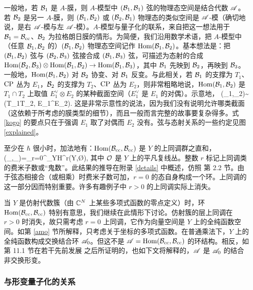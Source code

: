 一般地，若 ${\mathcal B}_1$ 是 $A$-膜，则 $A$-模型中 $({\mathcal B}_1,{\mathcal B}_1)$ 弦的物理态空间是结合代数 ${\mathscr A}$。若 ${\mathcal B}_2$ 是另一 $A$-膜，则 $({\mathcal B}_1,{\mathcal B}_2)$ 或 $({\mathcal B}_2,{\mathcal B}_1)$ 物理态的类似空间是 ${\mathscr A}$-模（确切地说，是右 ${\mathscr A}$-模与左 ${\mathscr A}$-模）。$A$-模型与量子化的联系，来自把这一想法用于 ${\mathcal B}_1={\mathcal B}_{\mathrm{cc}}$、${\mathcal B}_2$ 为拉格朗日膜的情形。为简便，我们沿用数学术语，把 $A$-模型中（任意 ${\mathcal B}_1,{\mathcal B}_2$ 的）$({\mathcal B}_1,{\mathcal B}_2)$ 物理态空间记作 ${\mathrm{Hom}}({\mathcal B}_1,{\mathcal B}_2)$。基本想法是：把 $({\mathcal B}_1,{\mathcal B}_2)$ 弦与 $({\mathcal B}_2,{\mathcal B}_3)$ 弦接合成 $({\mathcal B}_1,{\mathcal B}_3)$ 弦，可描述为态射的合成 ${\mathrm{Hom}}({\mathcal B}_2,{\mathcal B}_3)\otimes{\mathrm{Hom}}({\mathcal B}_1,{\mathcal B}_2)\to{\mathrm{Hom}}({\mathcal B}_1,{\mathcal B}_3)$，其中 ${\mathcal B}_1$ 先映到 ${\mathcal B}_2$，再映到 ${\mathcal B}_3$。一般地，${\mathrm{Hom}}({\mathcal B}_1,{\mathcal B}_2)$ 对 ${\mathcal B}_2$ 协变、对 ${\mathcal B}_1$ 反变。与此相关，若 ${\mathcal B}_1$ 的支撑为 $T_1$、${\mathrm{CP}}$ 丛为 $E_1$，${\mathcal B}_2$ 的支撑为 $T_2$、${\mathrm{CP}}$ 丛为 $E_2$，则非常粗略地说，${\mathrm{Hom}}({\mathcal B}_1,{\mathcal B}_2)$ 是 $T_1\cap T_2$ 上取值 $E_1^\vee\otimes E_2$ 的某种截面空间（$E_1^\vee$ 是 $E_1$ 的对偶）。示意地，
\be\label{kogo}\Hom(\B_1,\B_2)\sim \Gamma(T_1\cap T_2, E_1^\vee\otimes E_2).\ee
这是非常示意性的说法，因为我们没有说明允许哪类截面（这依赖于所考虑的膜类型的细节），而且一般而言完整的故事要复杂得多。式 \eqref{kogo} 的要点只在于强调 $E_1$ 取了对偶而 $E_2$ 没有。弦与态射关系的一些约定见图 \ref{explained}。

至少在 $\hbar$ 很小时，加法地有：${\mathrm{Hom}}({\mathcal B}_{\mathrm{cc}},{\mathcal B}_{\mathrm{cc}})$ 是 $Y$ 的上同调群之直和，
\be\label{poklo}\Hom(\B_\cc,\B_\cc)=\oplus_{r=0}^{\dim_\C Y}H^r(Y,\O),\ee
其中 ${\mathcal O}$ 是 $Y$ 上的平凡复线丛。整数 $r$ 标记上同调类的费米子数或“鬼数”。此结果的推导在附录 \ref{details} 中概述，仿照 \cite{GW} 第 2.2 节。由于弦态相接合（或相乘）时费米子数可加，$r=0$ 的态自身构成一个环。上同调的这一部分因而特别重要。许多有趣例子中 $r>0$ 的上同调实际上消失。

当 $Y$ 是仿射代数簇（由 ${\mathbb C}^N$ 上某些多项式函数的零点定义）时，环 ${\mathrm{Hom}}({\mathcal B}_{\mathrm{cc}},{\mathcal B}_{\mathrm{cc}})$ 特别有意思，我们继续在此情形下讨论。仿射簇的层上同调在 $r>0$ 时消失，故只需考虑 $r=0$ 上同调，它作为向量空间是 $Y$ 上的全纯函数空间。如第 \ref{amo} 节所解释，只考虑关于坐标的多项式函数。在普通乘法下，$Y$ 上的全纯函数构成交换结合环 ${\mathscr A}_0$。但这不是 ${\mathscr A}={\mathrm{Hom}}({\mathcal B}_{\mathrm{cc}},{\mathcal B}_{\mathrm{cc}})$ 的环结构。相反，如 \cite{KW} 第 11.1 节在若干先前发展 \cite{KO,BrS,Ka,Pe,Gu,AZ} 之后所证明的，也如下文将解释的，${\mathscr A}$ 是 ${\mathscr A}_0$ 的结合非交换形变。

\subsubsection{与形变量子化的关系}\label{defrel}

